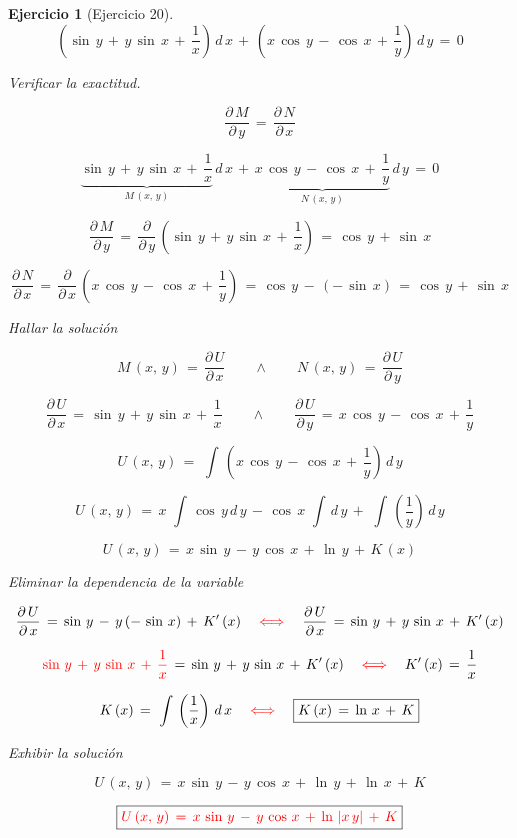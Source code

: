 \documentclass[a4paper,11pt,openany]{book}
\newtheorem{ejer}{Ejercicio}[section]
\begin{document}
\begin{ejer}[Ejercicio 20] 

  $$\left(\sin\,y\,+\,y\,\sin\,x\,+\,\dfrac{1}{x} \right)\,d\,x\,+\,\left(x\,\cos\,y\,-\,\cos\,x\,+\,\dfrac{1}{y} \right)\,d\,y\,=\,0$$ 

 Verificar la exactitud. 

$$\dfrac{\partial\,M}{\partial\,y}\,=\,\dfrac{\partial\,N}{\partial\,x}$$ 

$$\underbrace{\sin\,y\,+\,y\,\sin\,x\,+\,\dfrac{1}{x}}_{M\,(x,\,y)} \,d\,x\,+\,\underbrace{x\,\cos\,y\,-\,\cos\,x\,+\,\dfrac{1}{y}}_{N\,(x,\,y)}\,d\,y\,=\,0$$ 

$$\dfrac{\partial\,M}{\partial\,y}\,=\,\dfrac{\partial}{\partial\,y}\,\left(\sin\,y\,+\,y\,\sin\,x\,+\,\dfrac{1}{x} \right)\,=\,\boxed{\cos\,y\,+\,\sin\,x}$$ 

$$\dfrac{\partial\,N}{\partial\,x}\,=\,\dfrac{\partial}{\partial\,x}\,\left(x\,\cos\,y\,-\,\cos\,x\,+\,\dfrac{1}{y} \right)\,=\,\cos\,y\,-\,(-\,\sin\,x)\,=\,\boxed{\cos\,y\,+\,\sin\,x}$$ 

 Hallar la solución 

$$\boxed{M\,(x,\,y)\,=\,\dfrac{\partial\,U}{\partial\,x}} \qquad \wedge \qquad \boxed{N\,(x,\,y)\,=\,\dfrac{\partial\,U}{\partial\,y}}$$

$$\boxed{\dfrac{\partial\,U}{\partial\,x}\,=\,\sin\,y\,+\,y\,\sin\,x\,+\,\dfrac{1}{x} } \qquad \wedge \qquad \boxed{\dfrac{\partial\,U}{\partial\,y}\,=\,x\,\cos\,y\,-\,\cos\,x\,+\,\dfrac{1}{y} }$$ 

$$U\,(x,\,y)\,=\,\displaystyle\,\int\,\left(x\,\cos\,y\,-\,\cos\,x\,+\,\dfrac{1}{y} \right)\,d\,y$$ 

$$U\,(x,\,y)\,=\,x\,\displaystyle\,\int\,\cos\,y\,d\,y\,-\,\cos\,x\,\displaystyle\,\int\,d\,y\,+\,\displaystyle\,\int\,\left(\dfrac{1}{y} \right)\,d\,y$$ 

$$\boxed{U\,(x,\,y)\,=\,x\,\sin\,y\,-\,y\,\cos\,x\,+\,\ln\,y\,+\,K\,(x)}$$ 

 Eliminar la dependencia de la variable 

$$\dfrac{\partial\,U}{\partial\,x}\,=\,\sin\,y\,-\,y\,(-\,\sin\,x)\,+\,K'\,(x) \quad \textcolor{red}{\iff} \quad \dfrac{\partial\,U}{\partial\,x}\,=\,\sin\,y\,+\,y\,\sin\,x\,+\,K'\,(x)$$ 

$$\textcolor{red}{\sin\,y\,+\,y\,\sin\,x\,+\,\dfrac{1}{x}}\,=\,\sin\,y\,+\,y\,\sin\,x\,+\,K'\,(x) \quad \textcolor{red}{\iff} \quad K'\,(x)\,=\,\dfrac{1}{x}$$ 

$$K\,(x)\,=\,\displaystyle\,\int\,\left(\dfrac{1}{x} \right)\,d\,x \quad \textcolor{red}{\iff} \quad \boxed{K\,(x)\,=\,\ln\,x\,+\,K}$$ 

 Exhibir la solución  

$$U\,(x,\,y)\,=\,x\,\sin\,y\,-\,y\,\cos\,x\,+\,\ln\,y\,+\,\ln\,x\,+\,K$$ 

$$\boxed{\textcolor{red}{U\,(x,\,y)\,=\,x\,\sin\,y\,-\,y\,\cos\,x\,+\,\ln\,|x\,y|\,+\,K } }$$ 

\end{ejer} 
\end{document}
